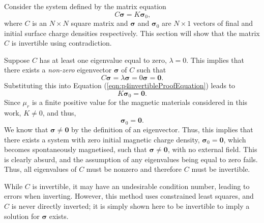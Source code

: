 Consider the system defined by the matrix equation
\begin{equation}\label{eqn:p4invertibleProofEquation}
    C \bm{\sigma} = K \bm{\sigma}_0 \text{,}
\end{equation}
where \(C\) is an \(N\times N\) square matrix and \(\bm{\sigma}\) and \(\bm{\sigma}_0\) are \(N\times 1\) vectors of final and initial surface charge densities respectively. This section will show that the matrix \(C\) is invertible using contradiction.

Suppose \(C\) has at least one eigenvalue equal to zero, \(\lambda = 0\). This implies that there exists a \textit{non-zero} eigenvector \(\bm{\sigma}\) of \(C\) such that
\begin{equation}
    C\bm{\sigma} = \lambda \bm{\sigma} = 0 \bm{\sigma} = \mathbf{0} \text{.}
\end{equation}
Substituting this into Equation (\ref{eqn:p4invertibleProofEquation}) leads to
\begin{equation}
    K \bm{\sigma}_0 = \mathbf{0} \text{.}
\end{equation}
Since \(\mu_r\) is a finite positive value for the magnetic materials considered in this work, \(K \neq 0\), and thus,
\begin{equation}
    \bm{\sigma}_0 = \mathbf{0} \text{.}
\end{equation}
We know that \(\bm{\sigma} \neq \mathbf{0}\) by the definition of an eigenvector. Thus, this implies that there exists a system with zero initial magnetic charge density, \(\bm{\sigma}_0 = \mathbf{0}\), which becomes spontaneously magnetised, such that \(\bm{\sigma} \neq \mathbf{0}\), with no external field. This is clearly absurd, and the assumption of any eigenvalues being equal to zero fails. Thus, all eigenvalues of \(C\) must be nonzero and therefore \(C\) must be invertible.

While \(C\) is invertible, it may have an undesirable condition number, leading to errors when inverting. However, this method uses constrained least squares, and \(C\) is never directly inverted; it is simply shown here to be invertible to imply a solution for \(\bm{\sigma}\) exists.